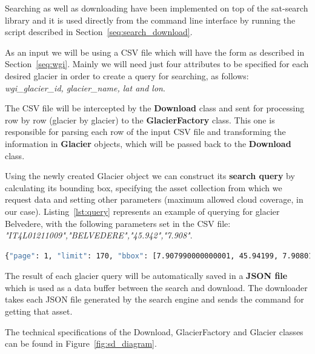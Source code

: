\documentclass[12pt, a4paper]{report}
\begin{document}
	\par Searching as well as downloading have been implemented on top of the sat-search library and it is used directly from the command line interface by running the script described in Section~\ref{seq:search_download}.
	
	\par As an input we will be using a CSV file which will have the form as described in Section~\ref{seq:wgi}. Mainly we will need just four attributes to be specified for each desired glacier in order to create a query for searching, as follows: \textit{wgi\_glacier\_id, glacier\_name, lat and lon}.
	
	\par The CSV file will be intercepted by the \textbf{Download } class and sent for processing row by row (glacier by glacier) to the \textbf{GlacierFactory} class. This one is responsible for parsing each row of the input CSV file and transforming the information in \textbf{Glacier} objects, which will be passed back to the \textbf{Download} class.
	
	\par Using the newly created Glacier object we can construct its \textbf{search query} by calculating its bounding box, specifying the asset collection from which we request data and setting other parameters (maximum allowed cloud coverage, in our case). Listing~\ref{lst:query} represents an example of querying for glacier Belvedere, with the following parameters set in the CSV file: \textit{"IT4L01211009","BELVEDERE","45.942","7.908"}.
	
	\begin{lstlisting}[caption={Search query created by sat-search},label={lst:query},language=Bash]
		{"page": 1, "limit": 170, "bbox": [7.907990000000001, 45.94199, 7.90801, 45.94201], "query": {"eo:cloud_cover": {"lt": 10}}, "collection": "landsat-8-l1"}
	\end{lstlisting}

	\par The result of each glacier query will be automatically saved in a \textbf{JSON file} which is used as a data buffer between the search and download. The downloader takes each JSON file generated by the search engine and sends the command for getting that asset.
	
	\par The technical specifications of the Download, GlacierFactory and Glacier classes can be found in Figure~\ref{fig:sd_diagram}.
	
\end{document}

